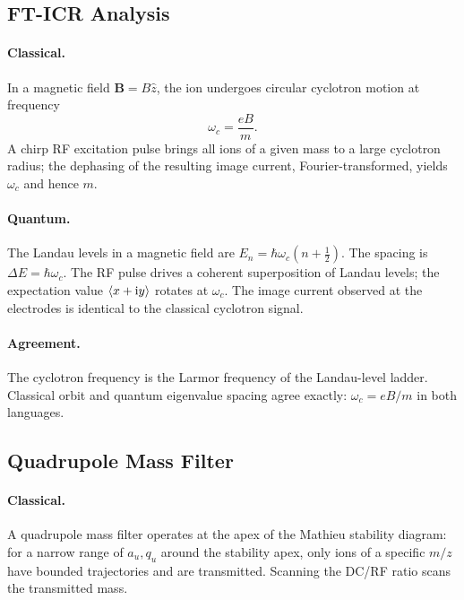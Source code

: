 \subsection{FT-ICR Analysis}
\label{sec:ch1-fticr}

\paragraph{Classical.}
In a magnetic field $\mathbf{B} = B\hat{z}$, the ion undergoes circular
cyclotron motion at frequency
\begin{equation}\label{eq:cyclotron}
  \omega_c = \frac{eB}{m}.
\end{equation}
A chirp RF excitation pulse brings all ions of a given mass to a large cyclotron
radius; the dephasing of the resulting image current, Fourier-transformed, yields
$\omega_c$ and hence $m$.

\paragraph{Quantum.}
The Landau levels in a magnetic field are
$E_n = \hbar\omega_c(n + \tfrac{1}{2})$.
The spacing is $\Delta E = \hbar\omega_c$.
The RF pulse drives a coherent superposition of Landau levels; the expectation
value $\langle x + \mathrm{i} y\rangle$ rotates at $\omega_c$.
The image current observed at the electrodes is identical to the classical
cyclotron signal.

\paragraph{Agreement.}
The cyclotron frequency is the Larmor frequency of the Landau-level ladder.
Classical orbit and quantum eigenvalue spacing agree exactly:
$\omega_c = eB/m$ in both languages.

\subsection{Quadrupole Mass Filter}
\label{sec:ch1-quad}

\paragraph{Classical.}
A quadrupole mass filter operates at the apex of the Mathieu stability diagram:
for a narrow range of $a_u, q_u$ around the stability apex, only ions of a
specific $m/z$ have bounded trajectories and are transmitted.
Scanning the DC/RF ratio scans the transmitted mass.

